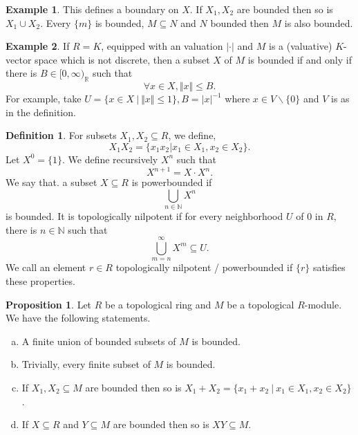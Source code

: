 \documentclass[10pt]{article}
\numberwithin{equation}{section}
\theoremstyle{definition}
\newtheorem{proposition}{Proposition}[subsection]
\newtheorem{definition}{Definition}[subsection]
\newtheorem{example}{Example}[subsection]
\newcommand{\norm}[1]{\Vert #1 \Vert}
\newcommand{\N}[0]{\mathbb{N}}
\newcommand{\R}[0]{\mathbb{R}}
\newcommand{\sep}[0]{\:|\:}
\newcommand{\ab}[1]{\vert #1 \vert}
\begin{document}
\begin{example}
    This defines a boundary on $X$. If $X_1,X_2$ are bounded then so is $X_1\cup X_2$. Every $\{m\}$ is bounded, $M\subseteq N$ and $N$ bounded then $M$ is also bounded.
\end{example}
\begin{example}
    If $R=K$, equipped with an valuation $\ab{\cdot}$ and $M$ is a (valuative) $K$-vector space which is not discrete, then a subset $X$ of $M$ is bounded if and only if there is $B\in[0,\infty)_\R$ such that
    \begin{equation*}
        \forall x\in X, \norm{x}\leq B.
    \end{equation*}
    For example, take $U = \{x\in X\sep \norm{x}\leq 1\}, B = \ab{x}^{-1}$ where $x\in V\backslash\{0\}$ and $V$ is as in the definition.
\end{example}
\begin{definition}
    \label{definition_11_3}
    For subsets $X_1,X_2\subseteq R$, we define,
    \begin{equation*}
        X_1X_2 = \{x_1x_2|x_1\in X_1,x_2\in X_2\}.
    \end{equation*}
    Let $X^0 = \{1\}$. We define recursively $X^n$ such that
    \begin{equation*}
        X^{n+1} = X\cdot X^n.
    \end{equation*}
    We say that. a subset $X\subseteq R$ is powerbounded if
    \begin{equation*}
        \bigcup_{n\in\N}X^n
    \end{equation*}
    is bounded. It is topologically nilpotent if for every neighborhood $U$ of $0$ in $R$, there is $n\in\N$ such that
    \begin{equation*}
        \bigcup_{m=n}^\infty X^m \subseteq U.
    \end{equation*}
    We call an element $r\in R$ topologically nilpotent / powerbounded if $\{r\}$ satisfies these properties.
\end{definition}
\begin{proposition}
    \label{fact_11_3}
    Let $R$ be a topological ring and $M$ be a topological $R$-module. We have the following statements.
    \begin{enumerate}[a.]
        \item A finite union of bounded subsets of $M$ is bounded.
        \item Trivially, every finite subset of $M$ is bounded.
        \item If $X_1,X_2\subseteq M$ are bounded then so is $X_1+X_2 = \{x_1+x_2\sep x_1\in X_1,x_2\in X_2\}$.
        \item If $X\subseteq R$ and $Y\subseteq M$ are bounded then so is $XY\subseteq M$.
    \end{enumerate}
\end{proposition}
\end{document}
